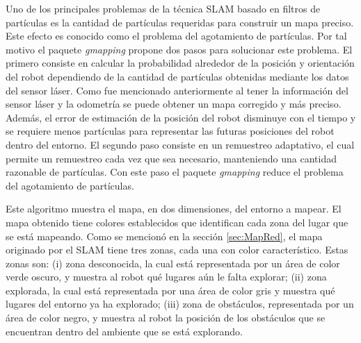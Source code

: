 Uno de los principales problemas de la técnica SLAM basado en filtros de partículas es la 
cantidad de partículas requeridas para construir un mapa preciso. Este efecto es conocido 
como el problema del agotamiento de partículas. Por tal motivo el paquete \textit{gmapping} 
propone dos pasos para solucionar este problema. El primero consiste en calcular la probabilidad 
alrededor de la posición y orientación del robot dependiendo de la cantidad de partículas 
obtenidas mediante los datos del sensor láser. Como fue mencionado anteriormente al tener 
la información del sensor láser y la odometría se puede obtener un mapa corregido y más 
preciso. Además, el error de estimación de la posición del robot disminuye con el tiempo y 
se requiere menos partículas para representar las futuras posiciones del robot dentro del 
entorno. El segundo paso consiste en un remuestreo adaptativo, el cual permite un remuestreo 
cada vez que sea necesario, manteniendo una cantidad razonable de partículas. Con este paso 
el paquete \textit{gmapping} reduce el problema del agotamiento de partículas.

Este algoritmo muestra el mapa, en dos dimensiones, del entorno a mapear. El mapa obtenido
tiene colores establecidos que identifican cada zona del lugar que se está mapeando. Como 
se mencionó en la sección \ref{sec:MapRed}, el mapa originado por el SLAM tiene tres zonas,
cada una con color característico. Estas zonas son: (i) zona desconocida, la cual está 
representada por un área de color verde oscuro, y muestra al robot qué lugares aún le falta 
explorar; (ii) zona explorada, la cual está representada por una área de color gris y muestra 
qué lugares del entorno ya ha explorado; (iii) zona de obstáculos, representada por un área 
de color negro, y muestra al robot la posición de los obstáculos que se encuentran dentro 
del ambiente que se está explorando.



